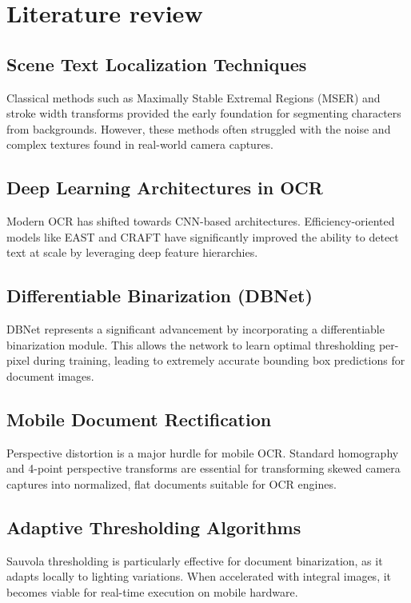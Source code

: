 \chapter{Literature review}
\section{Scene Text Localization Techniques}
Classical methods such as Maximally Stable Extremal Regions (MSER) and stroke width transforms provided the early foundation for segmenting characters from backgrounds. However, these methods often struggled with the noise and complex textures found in real-world camera captures.

\section{Deep Learning Architectures in OCR}
Modern OCR has shifted towards CNN-based architectures. Efficiency-oriented models like EAST and CRAFT have significantly improved the ability to detect text at scale by leveraging deep feature hierarchies.

\section{Differentiable Binarization (DBNet)}
DBNet represents a significant advancement by incorporating a differentiable binarization module. This allows the network to learn optimal thresholding per-pixel during training, leading to extremely accurate bounding box predictions for document images.

\section{Mobile Document Rectification}
Perspective distortion is a major hurdle for mobile OCR. Standard homography and 4-point perspective transforms are essential for transforming skewed camera captures into normalized, flat documents suitable for OCR engines.

\section{Adaptive Thresholding Algorithms}
Sauvola thresholding is particularly effective for document binarization, as it adapts locally to lighting variations. When accelerated with integral images, it becomes viable for real-time execution on mobile hardware.

